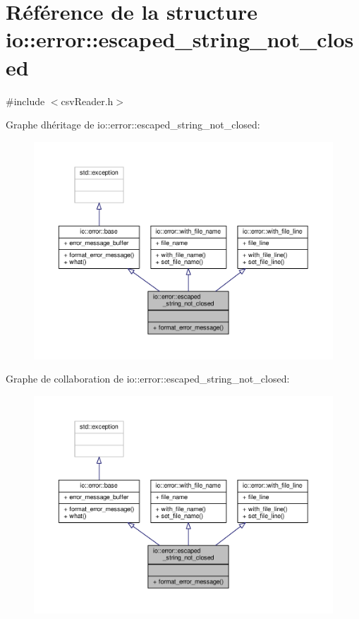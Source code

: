 \hypertarget{structio_1_1error_1_1escaped__string__not__closed}{}\section{Référence de la structure io\+:\+:error\+:\+:escaped\+\_\+string\+\_\+not\+\_\+closed}
\label{structio_1_1error_1_1escaped__string__not__closed}


{\ttfamily \#include $<$csv\+Reader.\+h$>$}



Graphe d\textquotesingle{}héritage de io\+:\+:error\+:\+:escaped\+\_\+string\+\_\+not\+\_\+closed\+:
\nopagebreak
\begin{figure}[H]
\begin{center}
\leavevmode
\includegraphics[width=350pt]{structio_1_1error_1_1escaped__string__not__closed__inherit__graph}
\end{center}
\end{figure}


Graphe de collaboration de io\+:\+:error\+:\+:escaped\+\_\+string\+\_\+not\+\_\+closed\+:
\nopagebreak
\begin{figure}[H]
\begin{center}
\leavevmode
\includegraphics[width=350pt]{structio_1_1error_1_1escaped__string__not__closed__coll__graph}
\end{center}
\end{figure}
